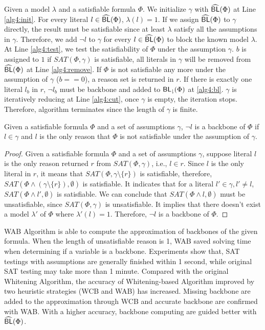 Given a model $\lambda$ and a satisfiable formula $\Phi$. We initialize $\gamma$ with ${\sf \widehat{BL}}(\Phi)$ at Line \ref{alg4:init}. For every literal $l\in{\sf \widehat{BL}}(\Phi)$, $\lambda(l)=1$. If we assign ${\sf \widehat{BL}}(\Phi)$ to $\gamma$ directly, the result must be satisfiable since at least $\lambda$ satisfy all the assumptions in $\gamma$. Therefore, we add $\neg l$ to $\gamma$ for every $l\in{\sf \widehat{BL}}(\Phi)$ to block the known model $\lambda$. At Line \ref{alg4:test}, we test the satisfiability of $\Phi$ under the assumption $\gamma$. $b$ is assigned to $1$ if $SAT(\Phi,\gamma)$ is satisfiable, all literals in $\gamma$ will be removed from ${\sf \widehat{BL}}(\Phi)$ at Line \ref{alg4:remove}. If $\Phi$ is not satisfiable any more under the assumption of $\gamma$ ($b==0$), a reason set is returned in $r$. If there is exactly one literal $l_b$ in $r$, $\neg l_b$ must be backbone and added to ${\sf {BL}_\downharpoonright}(\Phi)$ at \ref{alg4:bl}. $\gamma$ is iteratively reducing at Line \ref{alg4:cut}, once $\gamma$ is empty, the iteration stops. Therefore, algorithm terminates since the length of $\gamma$ is finite.

\begin{theorem}
Given a satisfiable formula $\Phi$ and a set of assumptions $\gamma$, $\neg l$ is a backbone of $\Phi$ if $l\in\gamma$ and $l$ is the only reason that $\Phi$ is not satisfiable under the assumption of $\gamma$.
\end{theorem}

\begin{proof}
Given a satisfiable formula $\Phi$ and a set of assumptions $\gamma$, suppose literal $l$ is the only reason returned $r$ from $SAT(\Phi,\gamma)$, i.e., $l\in r$.
Since $l$ is the only literal in $r$, it means that $SAT(\Phi,\gamma\setminus\{r\})$ is satisfiable, therefore, $SAT(\Phi\wedge(\gamma\setminus\{r\}),\emptyset)$ is satisfiable. It indicates that for a literal $l'\in\gamma, l'\neq l$, $SAT(\Phi\wedge l',\emptyset)$ is satisfiable. We can conclude that $SAT(\Phi\wedge l,\emptyset)$ must be unsatisfiable, since $SAT(\Phi,\gamma)$ is unsatisfiable. It implies that there doesn't exist a model $\lambda'$ of $\Phi$ where $\lambda'(l)=1$. Therefore, $\neg l$ is a backbone of $\Phi$.
\end{proof}

WAB Algorithm is able to compute the approximation of backbones of the given formula. When the length of unsatisfiable reason is 1, WAB saved solving time when determining if a variable is a backbone. Experiments show that, SAT testings with assumptions are generally finished within 1 second, while original SAT testing may take more than 1 minute. Compared with the original Whitening Algorithm, the accuracy of Whitening-based Algorithm improved by two heuristic strategies (WCB and WAB) has increased. Missing backbone are added to the approximation through WCB and accurate backbone are confirmed with WAB. With a higher accuracy, backbone computing are guided better with ${\sf \widehat{BL}}(\Phi)$.
